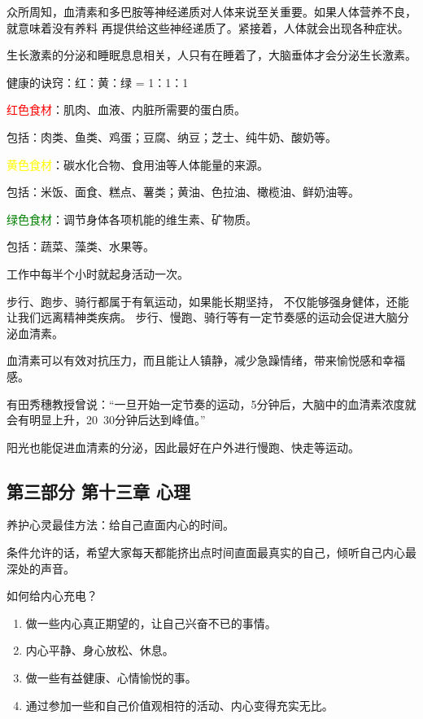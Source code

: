 \documentclass[12pt,a4paper]{article}
\newcommand{\textred}[1]{\textcolor{red}{#1}}           %
\newcommand{\textgreen}[1]{\textcolor{green}{#1}}       %
\newcommand{\textyellow}[1]{\textcolor{yellow}{#1}}     %
\begin{document}
众所周知，血清素和多巴胺等神经递质对人体来说至关重要。如果人体营养不良，就意味着没有养料
再提供给这些神经递质了。紧接着，人体就会出现各种症状。

生长激素的分泌和睡眠息息相关，人只有在睡着了，大脑垂体才会分泌生长激素。

健康的诀窍：红：黄：绿 = 1：1：1

\textred{红色食材}：肌肉、血液、内脏所需要的蛋白质。

包括：肉类、鱼类、鸡蛋；豆腐、纳豆；芝士、纯牛奶、酸奶等。

\textyellow{黄色食材}：碳水化合物、食用油等人体能量的来源。

包括：米饭、面食、糕点、薯类；黄油、色拉油、橄榄油、鲜奶油等。

\textgreen{绿色食材}：调节身体各项机能的维生素、矿物质。

包括：蔬菜、藻类、水果等。

工作中每半个小时就起身活动一次。

步行、跑步、骑行都属于有氧运动，如果能长期坚持，
不仅能够强身健体，还能让我们远离精神类疾病。
步行、慢跑、骑行等有一定节奏感的运动会促进大脑分泌血清素。

血清素可以有效对抗压力，而且能让人镇静，减少急躁情绪，带来愉悦感和幸福感。

有田秀穗教授曾说：“一旦开始一定节奏的运动，5分钟后，大脑中的血清素浓度就会有明显上升，20~30分钟后达到峰值。”

阳光也能促进血清素的分泌，因此最好在户外进行慢跑、快走等运动。



\subsection*{第三部分 第十三章 心理 }

{\centering {\Large {\kaishu \textcolor{gray}{内心能量不足时要及时补充}}}\par}

养护心灵最佳方法：给自己直面内心的时间。

条件允许的话，希望大家每天都能挤出点时间直面最真实的自己，倾听自己内心最深处的声音。

如何给内心充电？

\begin{enumerate}
    \item 做一些内心真正期望的，让自己兴奋不已的事情。
    \item 内心平静、身心放松、休息。
    \item 做一些有益健康、心情愉悦的事。
    \item 通过参加一些和自己价值观相符的活动、内心变得充实无比。
\end{enumerate}
\end{document}
